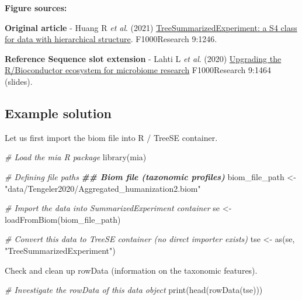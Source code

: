 \documentclass[
  oneside]{book}
\newenvironment{Shaded}{\begin{snugshade}}{\end{snugshade}}
\newcommand{\CommentTok}[1]{\textcolor[rgb]{0.56,0.35,0.01}{\textit{#1}}}
\newcommand{\DocumentationTok}[1]{\textcolor[rgb]{0.56,0.35,0.01}{\textbf{\textit{#1}}}}
\newcommand{\FunctionTok}[1]{\textcolor[rgb]{0.00,0.00,0.00}{#1}}
\newcommand{\NormalTok}[1]{#1}
\newcommand{\OtherTok}[1]{\textcolor[rgb]{0.56,0.35,0.01}{#1}}
\newcommand{\StringTok}[1]{\textcolor[rgb]{0.31,0.60,0.02}{#1}}
\begin{document}
\textbf{Figure sources:}

\textbf{Original article}
- Huang R \emph{et al}. (2021) \href{https://doi.org/10.12688/\%20f1000research.26669.2}{TreeSummarizedExperiment: a S4 class
for data with hierarchical structure}. F1000Research 9:1246.

\textbf{Reference Sequence slot extension}
- Lahti L \emph{et al}. (2020) \href{https://doi.org/10.7490/\%20f1000research.1118447.1}{Upgrading the R/Bioconductor ecosystem for microbiome
research} F1000Research 9:1464 (slides).

\hypertarget{example-solution}{%
\subsection{Example solution}\label{example-solution}}

Let us first import the biom file into R / TreeSE container.

\begin{Shaded}
\begin{Highlighting}[]
\CommentTok{\# Load the mia R package}
\FunctionTok{library}\NormalTok{(mia)}

\CommentTok{\# Defining file paths}
\DocumentationTok{\#\# Biom file (taxonomic profiles)}
\NormalTok{biom\_file\_path }\OtherTok{\textless{}{-}} \StringTok{"data/Tengeler2020/Aggregated\_humanization2.biom"}

\CommentTok{\# Import the data into SummarizedExperiment container}
\NormalTok{se }\OtherTok{\textless{}{-}} \FunctionTok{loadFromBiom}\NormalTok{(biom\_file\_path)}

\CommentTok{\# Convert this data to TreeSE container (no direct importer exists)}
\NormalTok{tse }\OtherTok{\textless{}{-}} \FunctionTok{as}\NormalTok{(se, }\StringTok{"TreeSummarizedExperiment"}\NormalTok{)}
\end{Highlighting}
\end{Shaded}

Check and clean up rowData (information on the taxonomic features).

\begin{Shaded}
\begin{Highlighting}[]
\CommentTok{\# Investigate the rowData of this data object}
\FunctionTok{print}\NormalTok{(}\FunctionTok{head}\NormalTok{(}\FunctionTok{rowData}\NormalTok{(tse)))}
\end{Highlighting}
\end{Shaded}
\end{document}

